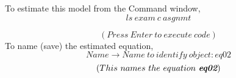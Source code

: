 \documentclass[12pt]{report}
\begin{document}
\noindent To estimate this model from the Command window,
$$ls\ exam\ c\ asgnmt$$
\begin{figure}[H]
	\centering
\end{figure}
\vspace{-\baselineskip}
$$(Press\ Enter\ to\ execute\ code)$$
\noindent To name (save) the estimated equation,
$$Name \to Name\ to\ identify\ object: eq02$$
$$(This\ names\ the\ equation\ \textit{\textbf{eq02}})$$
\begin{figure}[H]
	\centering
\end{figure}
\vspace{-\baselineskip}
\begin{figure}[H]
	\centering
\end{figure}
\vspace{-\baselineskip}
\end{document}
